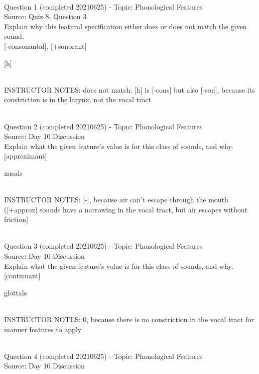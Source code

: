 \documentclass[12pt]{article}
\begin{document}
~\\

{\large Question 1} (completed 20210625) - Topic: Phonological Features\\
Source: Quiz 8, Question 3\\

Explain why this featural specification either does or does not match the given sound.\\

{[-consonantal]}, {[+sonorant]}

{[h]}


~\\
INSTRUCTOR NOTES: does not match: [h] is [-cons] but also [-son], because its constriction is in the larynx, not the vocal tract


~\\

{\large Question 2} (completed 20210625) - Topic: Phonological Features\\
Source: Day 10 Discussion\\

Explain what the given feature’s value is for this class of sounds, and why.\\

{[approximant]}

nasals


~\\
INSTRUCTOR NOTES: [-], because air can't escape through the mouth ([+approx] sounds have a narrowing in the vocal tract, but air escapes without friction)


~\\

{\large Question 3} (completed 20210625) - Topic: Phonological Features\\
Source: Day 10 Discussion\\

Explain what the given feature’s value is for this class of sounds, and why.\\

{[continuant]}

glottals


~\\
INSTRUCTOR NOTES: 0, because there is no constriction in the vocal tract for manner features to apply


~\\

{\large Question 4} (completed 20210625) - Topic: Phonological Features\\
Source: Day 10 Discussion\\
\end{document}
